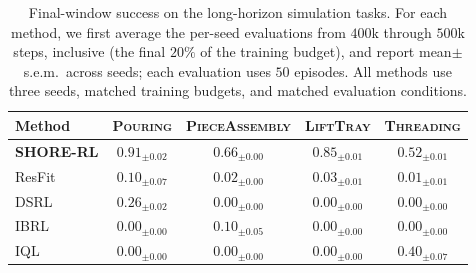 \documentclass[letterpaper]{article} %
\begin{document}
\begin{table}[t]
\centering
\small
\setlength{\tabcolsep}{0pt}
\begin{tabular*}{\columnwidth}{@{\extracolsep{\fill}}lcccc}
\toprule
Method & \textsc{Pouring} & \textsc{PieceAssembly} & \textsc{LiftTray} & \textsc{Threading} \\
\midrule
\textbf{SHORE-RL} & $\mathbf{0.91}_{\scriptscriptstyle\mathbf{\pm 0.02}}$ & $\mathbf{0.66}_{\scriptscriptstyle\mathbf{\pm 0.00}}$ & $\mathbf{0.85}_{\scriptscriptstyle\mathbf{\pm 0.01}}$ & $\mathbf{0.52}_{\scriptscriptstyle\mathbf{\pm 0.01}}$ \\
ResFit & $0.10_{\scriptscriptstyle\pm 0.07}$ & $0.02_{\scriptscriptstyle\pm 0.00}$ & $0.03_{\scriptscriptstyle\pm 0.01}$ & $0.01_{\scriptscriptstyle\pm 0.01}$ \\
DSRL & $0.26_{\scriptscriptstyle\pm 0.02}$ & $0.00_{\scriptscriptstyle\pm 0.00}$ & $0.00_{\scriptscriptstyle\pm 0.00}$ & $0.00_{\scriptscriptstyle\pm 0.00}$ \\
IBRL & $0.00_{\scriptscriptstyle\pm 0.00}$ & $0.10_{\scriptscriptstyle\pm 0.05}$ & $0.00_{\scriptscriptstyle\pm 0.00}$ & $0.00_{\scriptscriptstyle\pm 0.00}$ \\
IQL & $0.00_{\scriptscriptstyle\pm 0.00}$ & $0.00_{\scriptscriptstyle\pm 0.00}$ & $0.00_{\scriptscriptstyle\pm 0.00}$ & $0.40_{\scriptscriptstyle\pm 0.07}$ \\
\bottomrule
\end{tabular*}
\caption{Final-window success on the long-horizon simulation tasks. For each
method, we first average the per-seed evaluations from $400$k through $500$k
steps, inclusive (the final $20\%$ of the training budget), and report
mean$\pm$s.e.m.\ across seeds; each evaluation uses $50$ episodes. All methods
use three seeds, matched training budgets, and matched evaluation conditions.}
\label{tab:main}
\end{table}


\end{document}
